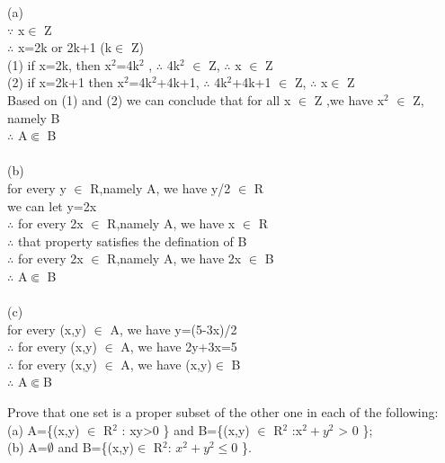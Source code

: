 \documentclass[11pt, a4paper, UTF8]{ctexart}
\begin{document}
\begin{solution}
(a)\\
$\because$ x$\in$ Z\\
$\therefore$ x=2k or 2k+1 (k$\in$ Z)\\
(1) if x=2k, then x$^2$=4k$^2$ , $\therefore$ 4k$^2$ $\in$ Z, $\therefore$ x $\in$ Z\\
(2) if x=2k+1 then x$^2$=4k$^2$+4k+1, $\therefore$ 4k$^2$+4k+1 $\in$ Z, $\therefore$ x$\in$ Z\\
Based on (1) and (2) we can conclude that for all x $\in$ Z ,we have x$^2$ $\in$ Z, namely B\\
$\therefore$ A$\Subset$ B\\
\\
(b)\\
for every y $\in$ R,namely A, we have y/2 $\in$ R\\
we can let y=2x\\
$\therefore$ for every 2x $\in$ R,namely A, we have x $\in$ R\\
$\therefore$ that property satisfies the defination of B\\
$\therefore$ for every 2x $\in$ R,namely A, we have 2x $\in$ B\\
$\therefore$ A$\Subset$ B\\
\\
(c)\\
for every (x,y) $\in$ A, we have y=(5-3x)/2\\
$\therefore$ for every (x,y) $\in$ A, we have 2y+3x=5\\
$\therefore$ for every (x,y) $\in$ A, we have (x,y)$\in$ B\\
$\therefore$ A$\Subset$B
\end{solution}

\begin{problem}[UD: 6.17]
Prove that one set is a proper subset of the other one in each of the following:\\
(a) A=\{(x,y) $\in$ R$^2$ : xy>0 \} and B=\{(x,y) $\in$ R$^2$ :x$^2 + y ^2$ > 0 \};\\
(b) A=$\emptyset$ and B=\{(x,y)$\in$ R$^2$: $x^2 + y^2 \le 0$ \}.
\end{problem}
\end{document}
